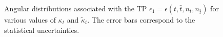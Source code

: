 \documentclass[aps,preprint,tightenlines,floatfix,superscriptaddress,nofootinbib,showpacs]{revtex4-1}
\def\tbar{\bar{t}}
\def\kp{\kappa_t}
\def\kpt{\tilde{\kappa}_t}
\providecommand{\DIFadd}[1]{{\protect\color{blue}\uwave{#1}}} %
\providecommand{\DIFdel}[1]{{\protect\color{red}\sout{#1}}}                      %
\providecommand{\DIFaddFL}[1]{\DIFadd{#1}} %
\providecommand{\DIFdelFL}[1]{\DIFdel{#1}} %
\providecommand{\DIFaddbeginFL}{} %
\providecommand{\DIFaddendFL}{} %
\providecommand{\DIFdelbeginFL}{} %
\providecommand{\DIFdelendFL}{} %
\begin{document}
\begin{center}
\begin{figure}[H]
\DIFdelbeginFL \DIFdelFL{\hspace*{-0.45cm}
}\DIFdelendFL \DIFaddbeginFL \DIFaddFL{\hspace*{-0.55cm}
}\DIFaddendFL %
\DIFdelbeginFL %
\DIFdelFL{\hspace*{-0.006\textwidth}
}%
\DIFdelendFL \DIFaddbeginFL {}
\DIFaddFL{\hspace*{-0.006\textwidth}
}
\vspace*{1cm}
\DIFaddendFL \caption{Angular distributions associated with the TP
  $\epsilon_1 = \epsilon(t,\tbar,n_t,n_{\tbar})$ for various values of
  $\kp$ and $\kpt$. The error bars correspond to the statistical
  uncertainties.}
\label{fig5}
\end{figure}
\end{center}
\end{document}
